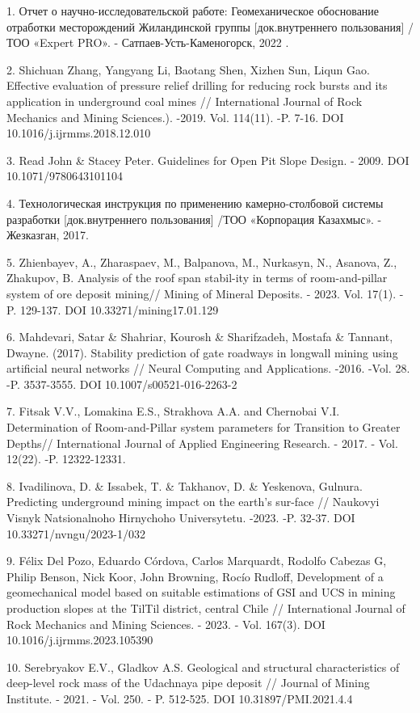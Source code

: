 \begin{noparindent}
1. Отчет о научно-исследовательской работе: Геомеханическое обоснование
отработки месторождений Жиландинской группы {[}док.внутреннего
пользования{]} / ТОО «Expert PRO». - Сатпаев-Усть-Каменогорск, 2022 .

2. Shichuan Zhang, Yangyang Li, Baotang Shen, Xizhen Sun, Liqun Gao.
Effective evaluation of pressure relief drilling for reducing rock
bursts and its application in underground coal mines // International
Journal of Rock Mechanics and Mining Sciences.). -2019. Vol. 114(11).
-P. 7-16. DOI 10.1016/j.ijrmms.2018.12.010

3. Read John \& Stacey Peter. Guidelines for Open Pit Slope Design. -
2009. DOI 10.1071/9780643101104

4. Технологическая инструкция по применению камерно-столбовой системы
разработки {[}док.внутреннего пользования{]} /ТОО «Корпорация Казахмыс».
- Жезказган, 2017.

5. Zhienbayev, A., Zharaspaev, M., Balpanova, M., Nurkasyn, N., Asanova,
Z., Zhakupov, B. Analysis of the roof span stabil-ity in terms of
room-and-pillar system of ore deposit mining// Mining of Mineral
Deposits. - 2023. Vol. 17(1). - P. 129-137. DOI
10.33271/mining17.01.129

6. Mahdevari, Satar \& Shahriar, Kourosh \& Sharifzadeh, Mostafa \&
Tannant, Dwayne. (2017). Stability prediction of gate roadways in
longwall mining using artificial neural networks // Neural Computing and
Applications. -2016. -Vol. 28. -P. 3537-3555. DOI
10.1007/s00521-016-2263-2

7. Fitsak V.V., Lomakina E.S., Strakhova A.A. and Chernobai V.I.
Determination of Room-and-Pillar system parameters for Transition to
Greater Depths// International Journal of Applied Engineering Research.
- 2017. - Vol. 12(22). -P. 12322-12331.

8. Ivadilinova, D. \& Issabek, T. \& Takhanov, D. \& Yeskenova, Gulnura.
Predicting underground mining impact on the earth's sur-face // Naukovyi
Visnyk Natsionalnoho Hirnychoho Universytetu. -2023. -P. 32-37. DOI
10.33271/nvngu/2023-1/032

9. Félix Del Pozo, Eduardo Córdova, Carlos Marquardt, Rodolfo Cabezas G,
Philip Benson, Nick Koor, John Browning, Rocío Rudloff, Development of a
geomechanical model based on suitable estimations of GSI and UCS in
mining production slopes at the TilTil district, central Chile //
International Journal of Rock Mechanics and Mining Sciences. - 2023. -
Vol. 167(3). DOI 10.1016/j.ijrmms.2023.105390

10. Serebryakov E.V., Gladkov A.S. Geological and structural
characteristics of deep-level rock mass of the Udachnaya pipe deposit //
Journal of Mining Institute. - 2021. - Vol. 250. - P. 512-525. DOI
10.31897/PMI.2021.4.4
\end{noparindent}

